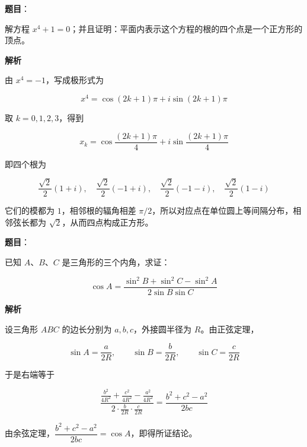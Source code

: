 \begin{answer}

\textbf{题目}：

解方程 $x^4+1=0$；并且证明：平面内表示这个方程的根的四个点是一个正方形的顶点。

\textbf{解析}

由 $x^4=-1$，写成极形式为

\nopagebreak[4]
\[x^4=\cos(2k+1)\pi+i\sin(2k+1)\pi\]

取 $k=0,1,2,3$，得到

\nopagebreak[4]
\[x_k=\cos\frac{(2k+1)\pi}{4}+i\sin\frac{(2k+1)\pi}{4}\]

即四个根为

\nopagebreak[4]
\[\frac{\sqrt2}{2}(1+i),\quad \frac{\sqrt2}{2}(-1+i),\quad \frac{\sqrt2}{2}(-1-i),\quad \frac{\sqrt2}{2}(1-i)\]

它们的模都为 $1$，相邻根的辐角相差 $\pi/2$，所以对应点在单位圆上等间隔分布，相邻弦长都为 $\sqrt2$，从而四点构成正方形。
\nopagebreak[4]
\begin{center}\end{center}
\nopagebreak[4]

\end{answer}
\begin{answer}

\textbf{题目}：

已知 $A$、$B$、$C$ 是三角形的三个内角，求证：

\nopagebreak[4]
\[\cos A=\frac{\sin^2B+\sin^2C-\sin^2A}{2\sin B\sin C}\]

\textbf{解析}

设三角形 $ABC$ 的边长分别为 $a,b,c$，外接圆半径为 $R$。由正弦定理，

\nopagebreak[4]
\[\sin A=\frac{a}{2R},\qquad \sin B=\frac{b}{2R},\qquad \sin C=\frac{c}{2R}\]

于是右端等于

\nopagebreak[4]
\[\frac{\frac{b^2}{4R^2}+\frac{c^2}{4R^2}-\frac{a^2}{4R^2}}{2\cdot\frac{b}{2R}\cdot\frac{c}{2R}}=\frac{b^2+c^2-a^2}{2bc}\]

由余弦定理，$\dfrac{b^2+c^2-a^2}{2bc}=\cos A$，即得所证结论。


\end{answer}

